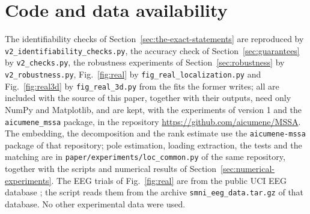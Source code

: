 \documentclass{article}
\begin{document}
\section*{Code and data availability}\label{code-and-data-availability}
The identifiability checks of Section~\ref{sec:the-exact-statements} are reproduced by \texttt{v2\_identifiability\_checks.py}, the accuracy check of Section~\ref{sec:guarantees} by \texttt{v2\_checks.py}, the robustness experiments of Section~\ref{sec:robustness} by \texttt{v2\_robustness.py}, Fig.~\ref{fig:real} by \texttt{fig\_real\_localization.py} and Fig.~\ref{fig:real3d} by \texttt{fig\_real\_3d.py} from the fits the former writes; all are included with the source of this paper, together with their outputs, need only NumPy and Matplotlib, and are kept, with the experiments of version 1 \cite{ref-MSSAv1} and the \texttt{aicumene\_mssa} package, in the repository \url{https://github.com/aicumene/MSSA}. The embedding, the decomposition and the rank estimate use the \texttt{aicumene-mssa} package of that repository; pole estimation, loading extraction, the tests and the matching are in \texttt{paper/experiments/loc\_common.py} of the same repository, together with the scripts and numerical results of Section~\ref{sec:numerical-experiments}. The EEG trials of Fig.~\ref{fig:real} are from the public UCI EEG database \cite{ref-UCI}; the script reads them from the archive \texttt{smni\_eeg\_data.tar.gz} of that database. No other experimental data were used.
\end{document}
